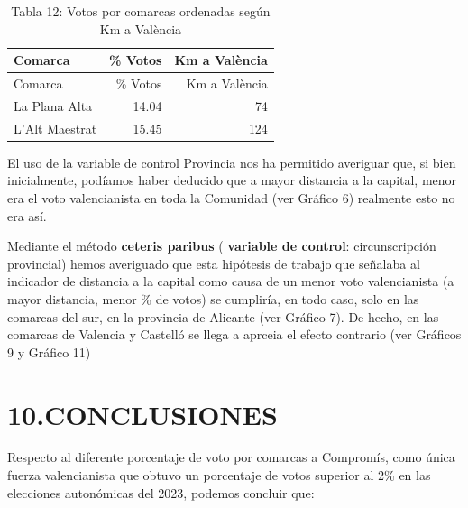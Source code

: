 \documentclass[
]{article}
\begin{document}
\begin{longtable}[]{@{}lrr@{}}
\caption{Tabla 12: Votos por comarcas ordenadas según Km a
València}\tabularnewline
\toprule\noalign{}
Comarca & \% Votos & Km a València \\
\midrule\noalign{}
\endfirsthead
\toprule\noalign{}
Comarca & \% Votos & Km a València \\
\midrule\noalign{}
\endhead
\bottomrule\noalign{}
\endlastfoot
La Plana Alta & 14.04 & 74 \\
L'Alt Maestrat & 15.45 & 124 \\
\end{longtable}

El uso de la variable de control Provincia nos ha permitido averiguar
que, si bien inicialmente, podíamos haber deducido que a mayor distancia
a la capital, menor era el voto valencianista en toda la Comunidad (ver
Gráfico 6) realmente esto no era así.

Mediante el método \textbf{ceteris paribus} ( \textbf{variable de
control}: circunscripción provincial) hemos averiguado que esta
hipótesis de trabajo que señalaba al indicador de distancia a la capital
como causa de un menor voto valencianista (a mayor distancia, menor \%
de votos) se cumpliría, en todo caso, solo en las comarcas del sur, en
la provincia de Alicante (ver Gráfico 7). De hecho, en las comarcas de
Valencia y Castelló se llega a aprceia el efecto contrario (ver Gráficos
9 y Gráfico 11)

\hypertarget{conclusiones}{%
\section{10.CONCLUSIONES}\label{conclusiones}}

Respecto al diferente porcentaje de voto por comarcas a Compromís, como
única fuerza valencianista que obtuvo un porcentaje de votos superior al
2\% en las elecciones autonómicas del 2023, podemos concluir que:
\end{document}

